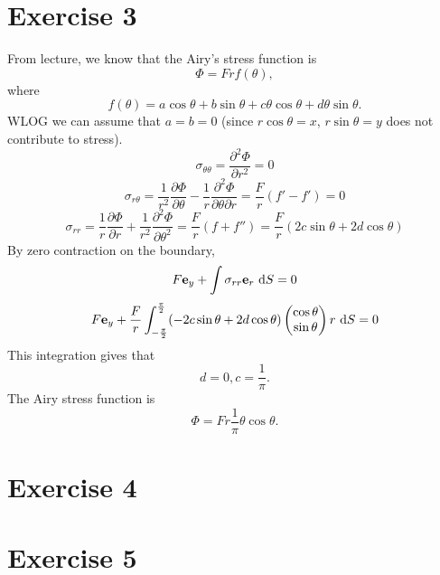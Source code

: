 \documentclass[12pt]{article}
\newcommand{\ee}{{\bf e}}
\newcommand{\pr}{{\partial}}
\newcommand{\mx}[1]{\begin{pmatrix}#1\end{pmatrix}}
\newcommand{\dx}[1]{\text{ d}#1}
\begin{document}
\section{Exercise 3}
From lecture, we know that the Airy's stress function is
\[
\Phi = Frf(\theta),
\]
where
\[
f(\theta) = a\cos\theta + b\sin\theta + c\theta\cos\theta + d\theta\sin\theta.
\]
WLOG we can assume that $a = b = 0$ (since $r\cos\theta = x$, $r\sin\theta = y$ does not contribute to stress).
\[
\sigma_{\theta\theta} = \frac{\pr^2 \Phi}{\pr r^2} =0
\]
\[
\sigma_{r\theta} = \frac {1}{ r^2} \frac{\pr \Phi}{\pr \theta} -\frac{1}{r} \frac{\pr^2 \Phi}{\pr \theta\pr r} = \frac{F}{r}(f' - f')=0
\]
\[
\sigma_{rr} = \frac 1 r \frac{\pr \Phi}{\pr r} +\frac{1}{r^2} \frac{\pr^2 \Phi}{\pr \theta^2} =\frac{F}{r}(f+f'')  = \frac F r(2c\sin\theta + 2d\cos\theta)
\]
By zero contraction on the boundary,
\[
F\ee_y +\int\sigma_{rr}\ee_r \dx{S} = 0
\]
\[
F\ee_y +\frac F r\int_{-\frac \pi 2}^{\frac \pi 2}(-2c\sin\theta + 2d\cos\theta)\mx{\cos\theta \\ \sin\theta} r\dx{S} = 0
\]
This integration gives that
\[
d=0, c = \frac 1 \pi.
\]
The Airy stress function is
\[
\Phi = Fr\frac 1 \pi \theta\cos\theta.
\]







\section{Exercise 4}
































\section{Exercise 5}
\end{document}
